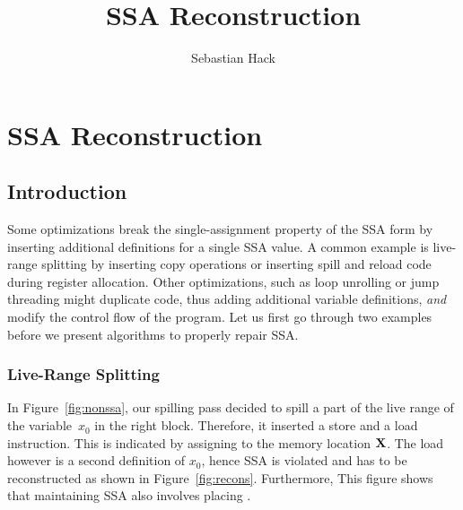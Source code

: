 

\title{SSA Reconstruction}
\author{Sebastian Hack}

\chapter{SSA Reconstruction }
\graphicspath{{repair_maintain_ssa_after_optimization/}{part1/repair_maintain_ssa_after_optimization/}}



\section{Introduction}

Some optimizations break the single-assignment property of the SSA form by inserting additional definitions for a single SSA value.
A common example is live-range splitting by inserting copy operations or inserting spill and reload code during register allocation.
Other optimizations, such as loop unrolling or jump threading might duplicate code, thus adding additional variable definitions, \emph{and} modify the control flow of the program.
Let us first go through two examples before we present algorithms to properly repair SSA.

\subsection{Live-Range Splitting}

In Figure~\ref{fig:nonssa}, our spilling pass decided to spill a part of the live range of the variable~$x_0$ in the right block.
Therefore, it inserted a store and a load instruction. 
This is indicated by assigning to the memory location $\textbf X$.
The load however is a second definition of $x_0$, hence SSA is violated and has to be reconstructed as shown in Figure~\ref{fig:recons}.
Furthermore, This figure shows that maintaining SSA also involves placing \phifuns.

